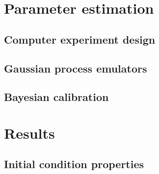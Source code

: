 \documentclass[aps,prc,reprint,amsmath,nofootinbib]{revtex4-1}
\begin{document}

\section{Parameter estimation}

\subsection{Computer experiment design}

\subsection{Gaussian process emulators}

\subsection{Bayesian calibration}


\section{Results}

\subsection{Initial condition properties}
\end{document}
